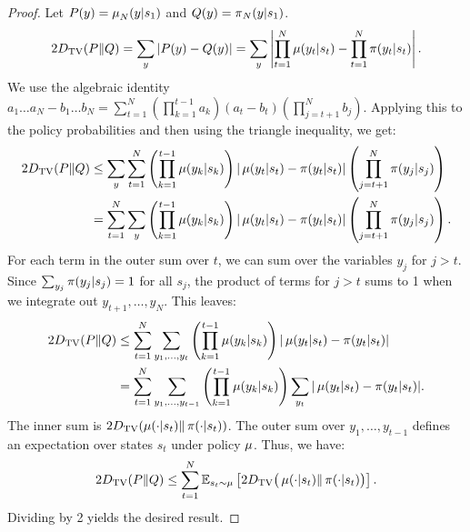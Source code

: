 \begin{proof}  
Let $P(y) = {\operatorname*{{\textcolor{black}{\mu}}}}_N(y|s_1)$ and $Q(y) = {\operatorname*{{\textcolor{black}{\pi}}}}_N(y|s_1)$.  
\begin{equation*}  
    2 D_{\mathrm{TV}}(P \|  Q) = \sum_{y} |P(y) - Q(y)| = \sum_{y} \left| \prod_{t=1}^N \operatorname*{{\textcolor{black}{\mu}}}(y_t|s_t) - \prod_{t=1}^N \operatorname*{{\textcolor{black}{\pi}}}(y_t|s_t) \right|.  
\end{equation*}  
We use the algebraic identity $a_1\dots a_N - b_1\dots b_N = \sum_{t=1}^N \left(\prod_{k=1}^{t-1} a_k\right) (a_t - b_t) \left(\prod_{j=t+1}^N b_j\right)$. Applying this to the policy probabilities and then using the triangle inequality, we get:  
\begin{align*}  
    2 D_{\mathrm{TV}}(P \|  Q) &\le \sum_{y} \sum_{t=1}^N \left(\prod_{k=1}^{t-1} \operatorname*{{\textcolor{black}{\mu}}}(y_k|s_k)\right) |\operatorname*{{\textcolor{black}{\mu}}}(y_t|s_t) - \operatorname*{{\textcolor{black}{\pi}}}(y_t|s_t)| \left(\prod_{j=t+1}^N \operatorname*{{\textcolor{black}{\pi}}}(y_j|s_j)\right) \\  
    &= \sum_{t=1}^N \sum_{y} \left(\prod_{k=1}^{t-1} \operatorname*{{\textcolor{black}{\mu}}}(y_k|s_k)\right) |\operatorname*{{\textcolor{black}{\mu}}}(y_t|s_t) - \operatorname*{{\textcolor{black}{\pi}}}(y_t|s_t)| \left(\prod_{j=t+1}^N \operatorname*{{\textcolor{black}{\pi}}}(y_j|s_j)\right).  
\end{align*}  
For each term in the outer sum over $t$, we can sum over the variables $y_j$ for $j>t$. Since $\sum_{y_j} \operatorname*{{\textcolor{black}{\pi}}}(y_j|s_j) = 1$ for all $s_j$, the product of terms for $j>t$ sums to 1 when we integrate out $y_{t+1}, \dots, y_N$. This leaves:  
\begin{align*}  
    2 D_{\mathrm{TV}}(P \|  Q) &\le \sum_{t=1}^N \sum_{y_1, \dots, y_t} \left(\prod_{k=1}^{t-1} \operatorname*{{\textcolor{black}{\mu}}}(y_k|s_k)\right) |\operatorname*{{\textcolor{black}{\mu}}}(y_t|s_t) - \operatorname*{{\textcolor{black}{\pi}}}(y_t|s_t)| \\  
    &= \sum_{t=1}^N \sum_{y_1, \dots, y_{t-1}} \left(\prod_{k=1}^{t-1} \operatorname*{{\textcolor{black}{\mu}}}(y_k|s_k)\right) \sum_{y_t} |\operatorname*{{\textcolor{black}{\mu}}}(y_t|s_t) - \operatorname*{{\textcolor{black}{\pi}}}(y_t|s_t)|.  
\end{align*}  
The inner sum is $2 D_{\mathrm{TV}}(\operatorname*{{\textcolor{black}{\mu}}}(\cdot|s_t) \|  \operatorname*{{\textcolor{black}{\pi}}}(\cdot|s_t))$. The outer sum over $y_1, \dots, y_{t-1}$ defines an expectation over states $s_t$ under policy $\operatorname*{{\textcolor{black}{\mu}}}$. Thus, we have:  
\begin{equation*}  
    2 D_{\mathrm{TV}}(P \|  Q) \le \sum_{t=1}^N \mathbb{E}_{s_t \sim \operatorname*{{\textcolor{black}{\mu}}}} \left[ 2 D_{\mathrm{TV}}\big(\operatorname*{{\textcolor{black}{\mu}}}(\cdot|s_t) \|  \operatorname*{{\textcolor{black}{\pi}}}(\cdot|s_t)\big) \right].  
\end{equation*}  
Dividing by 2 yields the desired result.  
\end{proof}


